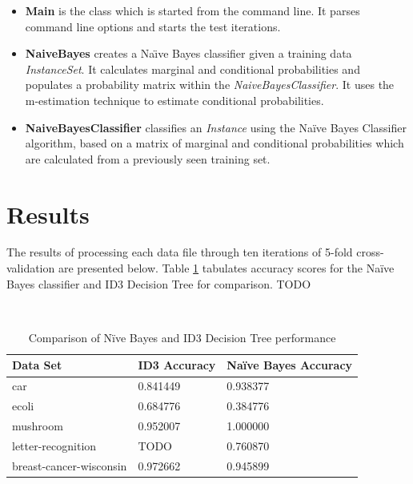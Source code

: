 \documentclass[10pt]{report}
\begin{document}
\begin{itemize}
\item \textbf{Main} is the class which is started from the command
  line. It parses command line options and starts the test iterations.

\item \textbf{NaiveBayes} creates a Na\"{\i}ve Bayes classifier
  given a training data \textit{InstanceSet}. It calculates marginal
  and conditional probabilities and populates a probability matrix
  within the \textit{NaiveBayesClassifier}. It uses the m-estimation
  technique to estimate conditional probabilities.

\item \textbf{NaiveBayesClassifier} classifies an \textit{Instance}
  using the Na\"{i}ve Bayes Classifier algorithm, based on a matrix of
  marginal and conditional probabilities which are calculated from a
  previously seen training set.

\end{itemize}


\section{Results}
\label{sec:results}
The results of processing each data file through ten iterations of
5-fold cross-validation are presented below. Table \ref{tab:comparison} tabulates accuracy scores for the Na\"{i}ve Bayes classifier and ID3 Decision Tree for comparison. TODO


\\
\begin{table}[h]
  \centering
  \begin{tabular}{ |l|l|l|} 
    \hline
    \textbf{Data Set} & \textbf{ID3 Accuracy} & \textbf{Na\"{i}ve Bayes Accuracy} \\ \hline
    car                      &  0.841449  &  0.938377 \\ \hline
    ecoli                    &  0.684776  &  0.384776 \\ \hline
    mushroom                 &  0.952007  &  1.000000 \\ \hline
    letter-recognition       &  TODO      &  0.760870 \\ \hline
    breast-cancer-wisconsin  &  0.972662  &  0.945899 \\ \hline
  \end{tabular}
  \caption{Comparison of N\"{i}ve Bayes and ID3 Decision Tree performance}
  \label{tab:comparison}
\end{table}
\end{document}
